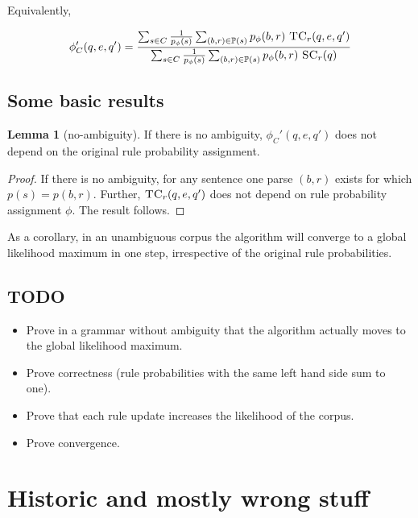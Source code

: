 \documentclass[12pt]{article}
\theoremstyle{definition}
\newtheorem{lemma}{Lemma}[section]
\begin{document}
Equivalently,

$$\phi_C'(q,e,q') = \frac{\sum_{s\in C}\frac{1}{p_\phi(s)}\sum_{(b,r)\in\mathbb{P}(s)} p_\phi(b,r)~ \textsc{TC}_r(q,e,q')}{\sum_{s\in C}\frac{1}{p_\phi(s)}\sum_{(b,r)\in\mathbb{P}(s)} p_\phi(b,r)~ \textsc{SC}_r(q)}$$ 





\subsection{Some basic results}

\begin{lemma}[no-ambiguity]
  If there is no ambiguity, $\phi_C'(q,e,q')$ does not depend on the original rule probability assignment.
\end{lemma}

\begin{proof}
  If there is no ambiguity, for any sentence one parse $(b,r)$ exists for which $p(s)=p(b,r)$. Further, $\textsc{TC}_r(q,e,q')$ does not depend on rule probability assignment $\phi$. The result follows.
\end{proof}

As a corollary, in an unambiguous corpus the algorithm will converge to a global likelihood maximum in one step, irrespective of the original rule probabilities.







\subsection{TODO}
\begin{itemize}
\item Prove in a grammar without ambiguity that the algorithm actually moves to the global likelihood maximum.
\item Prove correctness (rule probabilities with the same left hand side sum to one).
\item Prove that each rule update increases the likelihood of the corpus.
\item Prove convergence.
\end{itemize}



\section{Historic and mostly wrong stuff}
\end{document}
